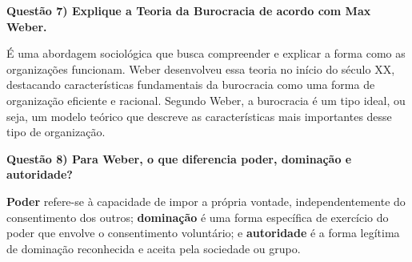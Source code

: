 \documentclass[11pt]{article}
\begin{document}
\noindent \textbf{Questão 7) Explique a Teoria da Burocracia de acordo com Max Weber.}\par
É uma abordagem sociológica que busca compreender e explicar a forma como as organizações funcionam. Weber desenvolveu essa teoria no início do século XX, destacando características fundamentais da burocracia como uma forma de organização eficiente e racional. Segundo Weber, a burocracia é um tipo ideal, ou seja, um modelo teórico que descreve as características mais importantes desse tipo de organização.

\noindent \textbf{Questão 8) Para Weber, o que diferencia poder, dominação e autoridade?}\par
\textbf{Poder} refere-se à capacidade de impor a própria vontade, independentemente do consentimento dos outros; \textbf{dominação} é uma forma específica de exercício do poder que envolve o consentimento voluntário; e \textbf{autoridade} é a forma legítima de dominação reconhecida e aceita pela sociedade ou grupo.\par
\end{document}
